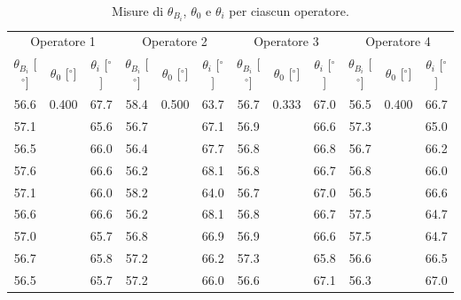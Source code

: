 \documentclass[10pt,twocolumn]{article}
\begin{document}
\onecolumn
\begin{table}[h]
\centering
\caption{Misure di $\theta_{B_i}$, $\theta_0$ e $\theta_i$ per ciascun operatore. }\label{tab:op}
\begin{tabular}{ccc@{\hspace{9pt}}ccc@{\hspace{9pt}}ccc@{\hspace{9pt}}ccc}
\toprule
\multicolumn{3}{c}{Operatore 1} & \multicolumn{3}{c}{Operatore 2} & \multicolumn{3}{c}{Operatore 3} & \multicolumn{3}{c}{Operatore 4} \\
\cmidrule(lr){1-3} \cmidrule(lr){4-6} \cmidrule(lr){7-9} \cmidrule(lr){10-12}
\makecell{$\theta_{B_i}$\\{[$^\circ$]}} & \makecell{$\theta_0$\\{[$^\circ$]}} & \makecell{$\theta_i$\\{[$^\circ$]}} & \makecell{$\theta_{B_i}$\\{[$^\circ$]}} & \makecell{$\theta_0$\\{[$^\circ$]}} & \makecell{$\theta_i$\\{[$^\circ$]}} & \makecell{$\theta_{B_i}$\\{[$^\circ$]}} & \makecell{$\theta_0$\\{[$^\circ$]}} & \makecell{$\theta_i$\\{[$^\circ$]}} & \makecell{$\theta_{B_i}$\\{[$^\circ$]}} & \makecell{$\theta_0$\\{[$^\circ$]}} & \makecell{$\theta_i$\\{[$^\circ$]}} \\
\midrule
56.6 & 0.400 & 67.7 & 58.4 & 0.500 & 63.7 & 56.7 & 0.333 & 67.0 & 56.5 & 0.400 & 66.7 \\
57.1 &  & 65.6 & 56.7 &  & 67.1 & 56.9 &  & 66.6 & 57.3 &  & 65.0 \\
56.5 &  & 66.0 & 56.4 &  & 67.7 & 56.8 &  & 66.8 & 56.7 &  & 66.2 \\
57.6 &  & 66.6 & 56.2 &  & 68.1 & 56.8 &  & 66.7 & 56.8 &  & 66.0 \\
57.1 &  & 66.0 & 58.2 &  & 64.0 & 56.7 &  & 67.0 & 56.5 &  & 66.6 \\
56.6 &  & 66.6 & 56.2 &  & 68.1 & 56.8 &  & 66.7 & 57.5 &  & 64.7 \\
57.0 &  & 65.7 & 56.8 &  & 66.9 & 56.9 &  & 66.6 & 57.5 &  & 64.7 \\
56.7 &  & 65.8 & 57.2 &  & 66.2 & 57.3 &  & 65.8 & 56.6 &  & 66.5 \\
56.5 &  & 65.7 & 57.2 &  & 66.0 & 56.6 &  & 67.1 & 56.3 &  & 67.0 \\

\end{tabular}
\end{table}
\end{document}
